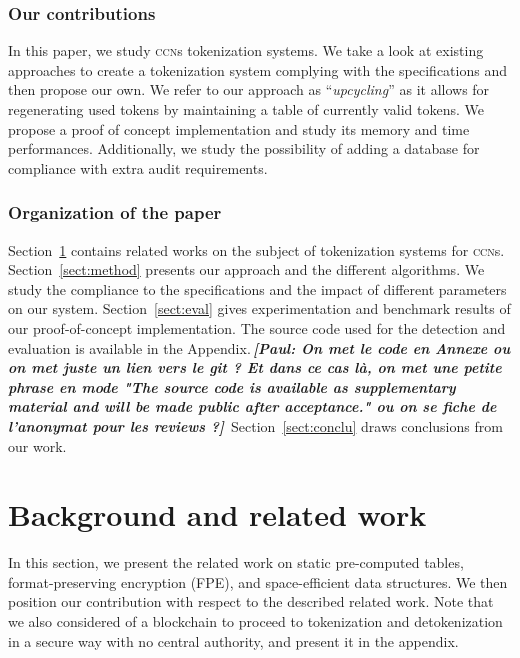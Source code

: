 \documentclass{llncs}
\newcommand{\ph}[1]{\emph{\bf \color{red}\,[Paul: #1]\,}}
\begin{document}
\subsubsection{Our contributions}
In this paper, we study \textsc{ccn}s tokenization systems. We take a look at existing approaches to create a tokenization system complying with the specifications and then propose our own. We refer to our approach as ``\textit{upcycling}'' as it allows for regenerating used tokens by maintaining a table of currently valid tokens. We propose a proof of concept implementation and study its memory and time performances. Additionally, we study the possibility of adding a database for compliance with extra audit requirements. 

\smallskip

\subsubsection{Organization of the paper}
Section~\ref{sect:background} contains related works on the subject of tokenization systems for \textsc{ccn}s. %
Section~\ref{sect:method} presents our approach and the different algorithms. We study the compliance to the specifications and the impact of different parameters on our system.
Section~\ref{sect:eval} gives experimentation and benchmark results of our proof-of-concept implementation. The source code used for the detection and evaluation is available in the Appendix.\ph{On met le code en Annexe ou on met juste un lien vers le git ? Et dans ce cas là, on met une petite phrase en mode 
"The source code is available as supplementary material and will be made public after acceptance." ou on se fiche de l'anonymat pour les reviews ?}
Section~\ref{sect:conclu} draws conclusions from our work.

\section{Background and related work}\label{sect:background}

In this section, we present the related work on static pre-computed tables, format-preserving encryption (FPE), and space-efficient data structures. We then position our contribution with respect to the described related work. Note that we also considered of a blockchain to proceed to tokenization and detokenization in a secure way with no central authority, and present it in the appendix.
\end{document}
